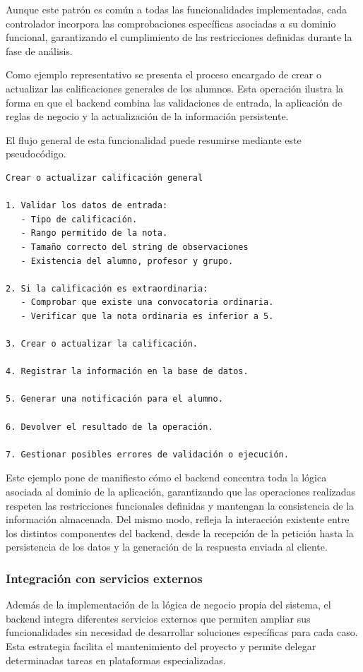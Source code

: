 Aunque este patrón es común a todas las funcionalidades implementadas, cada controlador incorpora las comprobaciones específicas asociadas a su dominio funcional, garantizando el cumplimiento de las restricciones definidas durante la fase de análisis.

Como ejemplo representativo se presenta el proceso encargado de crear o actualizar las calificaciones generales de los alumnos. Esta operación ilustra la forma en que el backend combina las validaciones de entrada, la aplicación de reglas de negocio y la actualización de la información persistente.

El flujo general de esta funcionalidad puede resumirse mediante este pseudocódigo.

\begin{Verbatim}[frame=single, fontsize=\small]
Crear o actualizar calificación general

1. Validar los datos de entrada:
   - Tipo de calificación.
   - Rango permitido de la nota.
   - Tamaño correcto del string de observaciones
   - Existencia del alumno, profesor y grupo.

2. Si la calificación es extraordinaria:
   - Comprobar que existe una convocatoria ordinaria.
   - Verificar que la nota ordinaria es inferior a 5.

3. Crear o actualizar la calificación.

4. Registrar la información en la base de datos.

5. Generar una notificación para el alumno.

6. Devolver el resultado de la operación.

7. Gestionar posibles errores de validación o ejecución.
\end{Verbatim}

Este ejemplo pone de manifiesto cómo el backend concentra toda la lógica asociada al dominio de la aplicación, garantizando que las operaciones realizadas respeten las restricciones funcionales definidas y mantengan la consistencia de la información almacenada. Del mismo modo, refleja la interacción existente entre los distintos componentes del backend, desde la recepción de la petición hasta la persistencia de los datos y la generación de la respuesta enviada al cliente.
\subsubsection{Integración con servicios externos}

Además de la implementación de la lógica de negocio propia del sistema, el backend integra diferentes servicios externos que permiten ampliar sus funcionalidades sin necesidad de desarrollar soluciones específicas para cada caso. Esta estrategia facilita el mantenimiento del proyecto y permite delegar determinadas tareas en plataformas especializadas.

